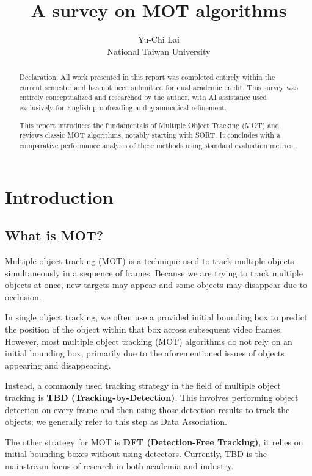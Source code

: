 \documentclass[10pt,twocolumn,letterpaper]{article}
\title{A survey on MOT algorithms}
\author{Yu-Chi Lai \\ National Taiwan University}
\begin{document}
\maketitle

\begin{abstract}
Declaration: All work presented in this report was completed entirely within the current semester and has not been submitted for dual academic credit. This survey was entirely conceptualized and researched by the author, with AI assistance used exclusively for English proofreading and grammatical refinement.

This report introduces the fundamentals of Multiple Object Tracking (MOT) and reviews classic MOT algorithms, notably starting with SORT. It concludes with a comparative performance analysis of these methods using standard evaluation metrics.
\end{abstract}

\section{Introduction}
\subsection{What is MOT?}
Multiple object tracking (MOT) is a technique used to track multiple objects simultaneously in a sequence of frames.  Because we are trying to track multiple objects at once, new targets may appear and some objects may disappear due to occlusion.

In single object tracking, we often use a provided initial bounding box to predict the position of the object within that box across subsequent video frames. However, most multiple object tracking (MOT) algorithms do not rely on an initial bounding box, primarily due to the aforementioned issues of objects appearing and disappearing.

Instead, a commonly used tracking strategy in the field of multiple object tracking is \textbf{TBD (Tracking-by-Detection)}. This involves performing object detection on every frame and then using those detection results to track the objects; we generally refer to this step as Data Association.

The other strategy for MOT is \textbf{DFT (Detection-Free Tracking)}, it relies on initial bounding boxes without using detectors. Currently, TBD is the mainstream focus of research in both academia and industry.
\end{document}
